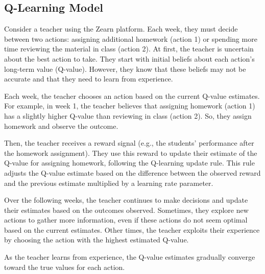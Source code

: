 \documentclass[
  number,
  preprint,
  3p,
  onecolumn]{elsarticle}
\begin{document}
\subsection{Q-Learning Model}\label{q-learning-model}

Consider a teacher using the Zearn platform. Each week, they must decide
between two actions: assigning additional homework (action 1) or
spending more time reviewing the material in class (action 2). At first,
the teacher is uncertain about the best action to take. They start with
initial beliefs about each action's long-term value (Q-value). However,
they know that these beliefs may not be accurate and that they need to
learn from experience.

Each week, the teacher chooses an action based on the current Q-value
estimates. For example, in week 1, the teacher believes that assigning
homework (action 1) has a slightly higher Q-value than reviewing in
class (action 2). So, they assign homework and observe the outcome.

Then, the teacher receives a reward signal (e.g., the students'
performance after the homework assignment). They use this reward to
update their estimate of the Q-value for assigning homework, following
the Q-learning update rule. This rule adjusts the Q-value estimate based
on the difference between the observed reward and the previous estimate
multiplied by a learning rate parameter.

Over the following weeks, the teacher continues to make decisions and
update their estimates based on the outcomes observed. Sometimes, they
explore new actions to gather more information, even if these actions do
not seem optimal based on the current estimates. Other times, the
teacher exploits their experience by choosing the action with the
highest estimated Q-value.

As the teacher learns from experience, the Q-value estimates gradually
converge toward the true values for each action.
\end{document}
